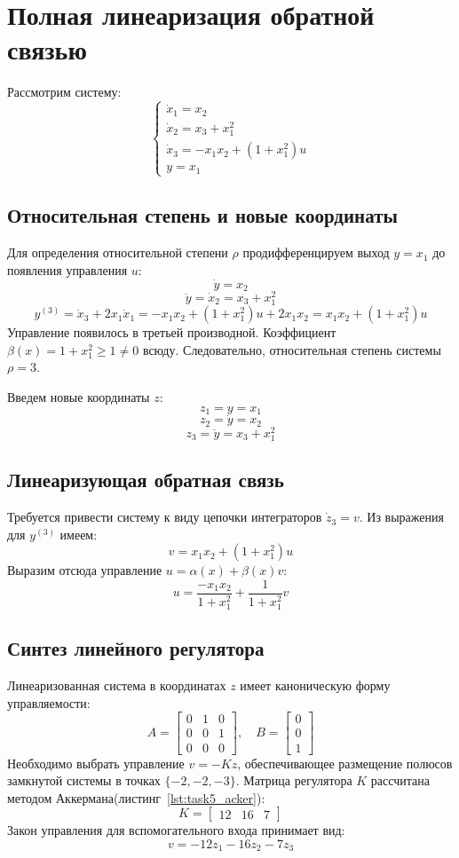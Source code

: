 \documentclass[a4paper,12pt]{article}
\begin{document}
	
	
\newpage \section{Полная линеаризация обратной связью}

Рассмотрим систему:
\begin{equation}
	\begin{cases}
		\dot{x}_1 = x_2 \\
		\dot{x}_2 = x_3 + x_1^2 \\
		\dot{x}_3 = -x_1 x_2 + (1 + x_1^2)u \\
		y = x_1
	\end{cases}
\end{equation}

\subsection{Относительная степень и новые координаты}
Для определения относительной степени $\rho$ продифференцируем выход $y=x_1$ до появления управления $u$:
\[ \dot{y} = x_2 \]
\[ \ddot{y} = \dot{x}_2 = x_3 + x_1^2 \]
\[ y^{(3)} = \dot{x}_3 + 2x_1\dot{x}_1 = -x_1 x_2 + (1+x_1^2)u + 2x_1 x_2 = x_1 x_2 + (1+x_1^2)u \]
Управление появилось в третьей производной. Коэффициент $\beta(x) = 1+x_1^2 \ge 1 \neq 0$ всюду.
Следовательно, относительная степень системы \textbf{$\rho = 3$}.

Введем новые координаты $z$:
\[ z_1 = y = x_1 \]
\[ z_2 = \dot{y} = x_2 \]
\[ z_3 = \ddot{y} = x_3 + x_1^2 \]

\subsection{Линеаризующая обратная связь}
Требуется привести систему к виду цепочки интеграторов $\dot{z}_3 = v$.
Из выражения для $y^{(3)}$ имеем:
\[ v = x_1 x_2 + (1+x_1^2)u \]
Выразим отсюда управление $u = \alpha(x) + \beta(x)v$:
\[ u = \frac{-x_1 x_2}{1+x_1^2} + \frac{1}{1+x_1^2}v \]

\subsection{Синтез линейного регулятора}

Линеаризованная система в координатах $z$ имеет каноническую форму управляемости:
\[
A = \begin{bmatrix} 0 & 1 & 0 \\ 0 & 0 & 1 \\ 0 & 0 & 0 \end{bmatrix}, \quad 
B = \begin{bmatrix} 0 \\ 0 \\ 1 \end{bmatrix}
\]
Необходимо выбрать управление $v = -Kz$, обеспечивающее размещение полюсов замкнутой системы в точках $\{-2, -2, -3\}$. Матрица регулятора $K$ рассчитана методом Аккермана(листинг~\ref{lst:task5_acker}):
\[
K = \begin{bmatrix} 12 & 16 & 7 \end{bmatrix}
\]
Закон управления для вспомогательного входа принимает вид:
\[
v = -12z_1 - 16z_2 - 7z_3
\]
\end{document}

